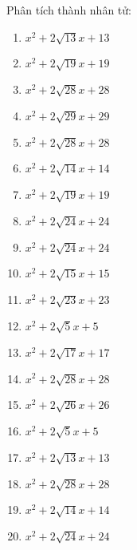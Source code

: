 \documentclass[12pt,a4paper]{article}
\begin{document}
\begin{ex}
	Phân tích thành nhân tử:
	\begin{enumerate}
		\item ${x^2 + 2\sqrt{13}x+13}$
		\item ${x^2 + 2\sqrt{19}x+19}$
		\item ${x^2 + 2\sqrt{28}x+28}$
		\item ${x^2 + 2\sqrt{29}x+29}$
		\item ${x^2 + 2\sqrt{28}x+28}$
		\item ${x^2 + 2\sqrt{14}x+14}$
		\item ${x^2 + 2\sqrt{19}x+19}$
		\item ${x^2 + 2\sqrt{24}x+24}$
		\item ${x^2 + 2\sqrt{24}x+24}$
		\item ${x^2 + 2\sqrt{15}x+15}$
		\item ${x^2 + 2\sqrt{23}x+23}$
		\item ${x^2 + 2\sqrt{5}x+5}$
		\item ${x^2 + 2\sqrt{17}x+17}$
		\item ${x^2 + 2\sqrt{28}x+28}$
		\item ${x^2 + 2\sqrt{26}x+26}$
		\item ${x^2 + 2\sqrt{5}x+5}$
		\item ${x^2 + 2\sqrt{13}x+13}$
		\item ${x^2 + 2\sqrt{28}x+28}$
		\item ${x^2 + 2\sqrt{14}x+14}$
		\item ${x^2 + 2\sqrt{24}x+24}$
	\end{enumerate}
\end{ex}
\end{document}
